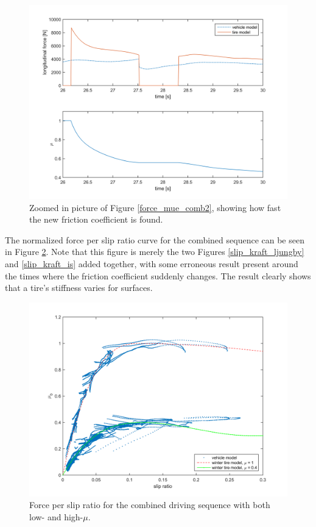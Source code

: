 \begin{figure}[h]
	\centering
	\includegraphics[width=1.0\textwidth]{Pictures/force_mue_comb2_zoom}
	\caption {Zoomed in picture of Figure \ref{force_mue_comb2}, showing how fast the new friction coefficient is found.}
	\label{force_mue_comb2_zoom}
\end{figure}

The normalized force per slip ratio curve for the combined sequence can be seen in Figure \ref{slip_kraft_comb2}. Note that this figure is merely the two Figures \ref{slip_kraft_ljungby} and \ref{slip_kraft_is} added together, with some erroneous result present around the times where the friction coefficient suddenly changes. The result clearly shows that a tire's stiffness varies for surfaces.

\begin{figure}[h]
	\centering
	\includegraphics[width=1.0\textwidth]{Pictures/slip_kraft_comb2}
	\caption {Force per slip ratio for the combined driving sequence with both low- and high-$ \mu $.}
	\label{slip_kraft_comb2}
\end{figure}

